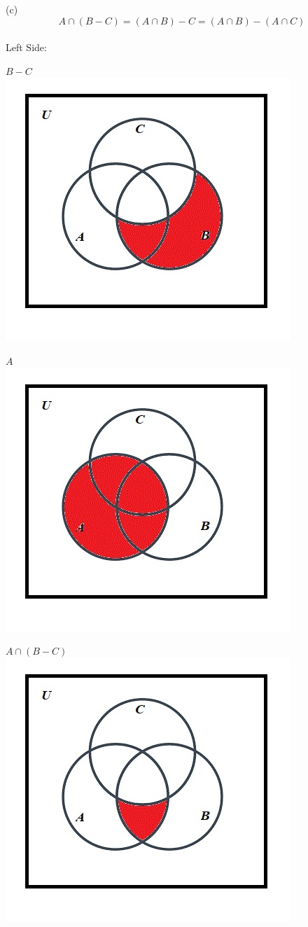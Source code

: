 \documentclass[10pt]{article}
\begin{document}
(c)
$$A \cap (B - C) = (A \cap B) -  C = (A \cap B) - (A \cap C)$$\\

Left Side:

$B - C$\\
\includegraphics[scale=0.55]{26}

$A$\\
\includegraphics[scale=0.55]{12}

$A \cap (B - C)$\\
\includegraphics[scale=0.55]{27}
\end{document}
